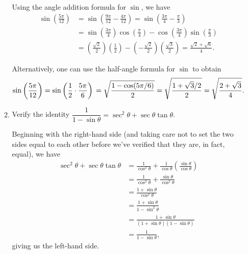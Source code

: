\documentclass[12pt]{article}
\newcommand{\points}[1]{\marginpar{\hspace{24pt}[#1]}}
\begin{document}
\begin{enumerate}
\begin{enumerate}
Using the angle addition formula for $\sin$, we have
\begin{align*}
 \sin\left(\frac{5\pi}{12}\right) & = \sin\left(\frac{9\pi}{12}-\frac{4\pi}{12}\right) = \sin\left(\frac{3\pi}{4}-\frac{\pi}{3}\right)\\
& = \sin\left(\frac{3\pi}{4}\right)\cos\left(\frac{\pi}{4}\right)-\cos\left(\frac{3\pi}{4}\right)\sin\left(\frac{\pi}{3}\right)\\
& = \left(\frac{\sqrt{2}}{2}\right)\left(\frac{1}{2}\right) - \left(-\frac{\sqrt{2}}{2}\right)\left(\frac{\sqrt{3}}{2}\right) = \frac{\sqrt{2}+\sqrt{6}}{4}.
\end{align*}

\medskip

Alternatively, one can use the half-angle formula for $\sin$ to obtain
\[
 \sin\left(\frac{5\pi}{12}\right)  = \sin\left(\frac{1}{2}\cdot \frac{5\pi}{6}\right)\\
 = \sqrt{\frac{1-\cos(5\pi/6)}{2}} = \sqrt{\frac{1+\sqrt{3}/2}{2}} = \sqrt{\frac{2+\sqrt{3}}{4}}.
\]

\bigskip



\item Verify the identity $\dfrac{1}{1-\sin\theta} = \sec^2\theta+\sec\theta\tan\theta$. \points{4}

\bigskip

Beginning with the right-hand side (and taking care not to set the two sides equal to each other before we've verified that they are, in fact, equal), we have
\begin{align*}
 \sec^2\theta+\sec\theta\tan\theta & = \frac{1}{\cos^2\theta}+\frac{1}{\cos\theta}\left(\frac{\sin\theta}{\cos\theta}\right)\\
& = \frac{1}{\cos^2\theta}+\frac{\sin\theta}{\cos^2\theta}\\
& = \frac{1+\sin\theta}{\cos^2\theta}\\
& = \frac{1+\sin\theta}{1-\sin^2\theta}\\
& = \frac{1+\sin\theta}{(1+\sin\theta)(1-\sin\theta)}\\
& = \frac{1}{1-\sin\theta},
\end{align*}
giving us the left-hand side.
      \end{enumerate}


\end{enumerate}
\end{document}
